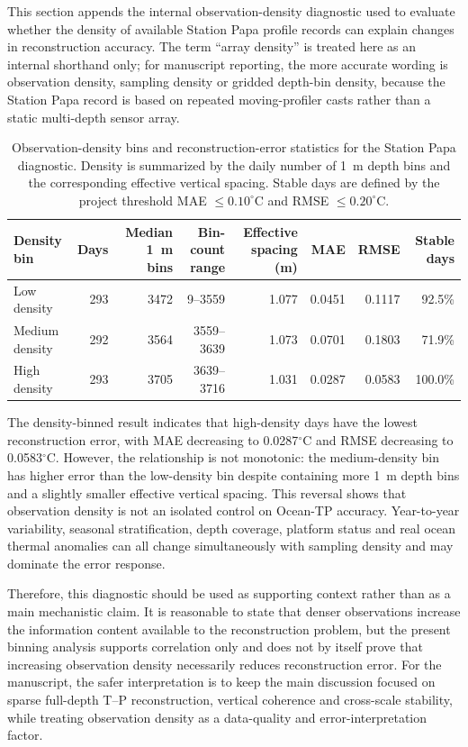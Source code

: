 \documentclass[10pt]{article}
\begin{document}
\noindent
This section appends the internal observation-density diagnostic used to evaluate whether the density of available Station Papa profile records can explain changes in reconstruction accuracy.
The term ``array density'' is treated here as an internal shorthand only; for manuscript reporting, the more accurate wording is observation density, sampling density or gridded depth-bin density, because the Station Papa record is based on repeated moving-profiler casts rather than a static multi-depth sensor array.

\begin{table}[htbp]
\centering
\caption{Observation-density bins and reconstruction-error statistics for the Station Papa diagnostic. Density is summarized by the daily number of 1~m depth bins and the corresponding effective vertical spacing. Stable days are defined by the project threshold MAE $\leq 0.10^\circ$C and RMSE $\leq 0.20^\circ$C.}
\label{tab:station-papa-observation-density-bins}
\small
\setlength{\tabcolsep}{4.0pt}
\renewcommand{\arraystretch}{1.10}
\begin{tabular}{lrrrrrrr}
\toprule
Density bin & Days & Median 1~m bins & Bin-count range & Effective spacing (m) & MAE & RMSE & Stable days \\
\midrule
Low density & 293 & 3472 & 9--3559 & 1.077 & 0.0451 & 0.1117 & 92.5\% \\
Medium density & 292 & 3564 & 3559--3639 & 1.073 & 0.0701 & 0.1803 & 71.9\% \\
High density & 293 & 3705 & 3639--3716 & 1.031 & 0.0287 & 0.0583 & 100.0\% \\
\bottomrule
\end{tabular}
\end{table}

\noindent
The density-binned result indicates that high-density days have the lowest reconstruction error, with MAE decreasing to 0.0287$^\circ$C and RMSE decreasing to 0.0583$^\circ$C.
However, the relationship is not monotonic: the medium-density bin has higher error than the low-density bin despite containing more 1~m depth bins and a slightly smaller effective vertical spacing.
This reversal shows that observation density is not an isolated control on Ocean-TP accuracy.
Year-to-year variability, seasonal stratification, depth coverage, platform status and real ocean thermal anomalies can all change simultaneously with sampling density and may dominate the error response.

\noindent
Therefore, this diagnostic should be used as supporting context rather than as a main mechanistic claim.
It is reasonable to state that denser observations increase the information content available to the reconstruction problem, but the present binning analysis supports correlation only and does not by itself prove that increasing observation density necessarily reduces reconstruction error.
For the manuscript, the safer interpretation is to keep the main discussion focused on sparse full-depth T--P reconstruction, vertical coherence and cross-scale stability, while treating observation density as a data-quality and error-interpretation factor.
\end{document}
